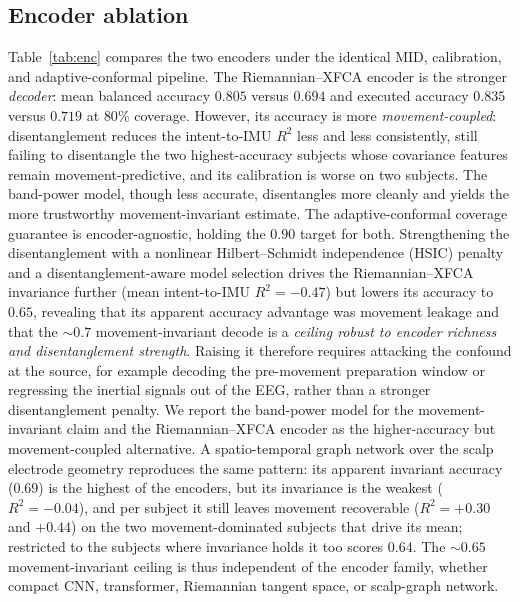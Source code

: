 \documentclass[journal]{IEEEtran}
\begin{document}
\subsection{Encoder ablation}\label{sec:ablation}
Table~\ref{tab:enc} compares the two encoders under the identical MID, calibration,
and adaptive-conformal pipeline. The Riemannian--XFCA encoder is the stronger
\emph{decoder}: mean balanced accuracy $0.805$ versus $0.694$ and executed accuracy
$0.835$ versus $0.719$ at $80\%$ coverage. However, its accuracy is more
\emph{movement-coupled}: disentanglement reduces the intent-to-IMU $R^2$ less and
less consistently, still failing to disentangle the two highest-accuracy subjects
whose covariance features remain movement-predictive, and its calibration is worse on
two subjects. The band-power model, though less accurate, disentangles more cleanly
and yields the more trustworthy movement-invariant estimate. The adaptive-conformal
coverage guarantee is encoder-agnostic, holding the $0.90$ target for both.
Strengthening the disentanglement with a nonlinear Hilbert--Schmidt independence
(HSIC) penalty and a disentanglement-aware model selection drives the
Riemannian--XFCA invariance further (mean intent-to-IMU $R^2=-0.47$) but lowers its
accuracy to $0.65$, revealing that its apparent accuracy advantage was movement
leakage and that the ${\sim}0.7$ movement-invariant decode is a \emph{ceiling robust
to encoder richness and disentanglement strength}. Raising it therefore requires
attacking the confound at the source, for example decoding the pre-movement
preparation window or regressing the inertial signals out of the EEG, rather than a
stronger disentanglement penalty. We report the band-power model for the
movement-invariant claim and the Riemannian--XFCA encoder as the higher-accuracy but
movement-coupled alternative. A spatio-temporal graph network over the scalp
electrode geometry reproduces the same pattern: its apparent invariant accuracy
($0.69$) is the highest of the encoders, but its invariance is the weakest
($R^2=-0.04$), and per subject it still leaves movement recoverable ($R^2=+0.30$
and $+0.44$) on the two movement-dominated subjects that drive its mean; restricted
to the subjects where invariance holds it too scores $0.64$. The ${\sim}0.65$
movement-invariant ceiling is thus independent of the encoder family, whether compact
CNN, transformer, Riemannian tangent space, or scalp-graph network.
\end{document}
